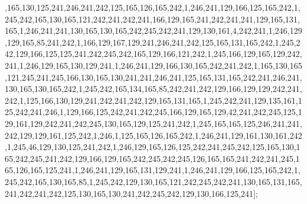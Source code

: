 ,165,130,125,241,246,241,242,125,165,126,165,242,1,246,241,129,166,125,165,242,1,245,242,165,130,165,121,242,241,242,241,166,129,165,241,242,241,241,129,165,131,165,1,246,241,241,130,165,130,165,242,245,242,241,129,130,161,4,242,241,1,246,129,129,165,85,241,242,1,166,129,167,129,241,246,241,242,125,165,131,165,242,1,245,242,129,166,125,125,241,242,245,242,165,129,166,121,242,1,245,166,129,165,129,242,241,1,246,129,165,130,129,241,1,246,241,129,166,130,165,242,241,242,1,165,130,165,121,245,241,245,166,130,165,130,241,241,246,241,125,165,131,165,242,241,246,241,130,165,130,165,242,1,245,242,165,134,165,85,242,241,242,129,166,129,129,242,241,242,1,125,166,130,129,241,242,241,242,129,165,131,165,1,245,242,241,129,135,161,125,242,241,246,1,129,166,125,242,241,242,245,166,129,165,129,42,241,242,245,125,129,161,129,242,241,242,245,130,165,129,125,241,242,1,245,165,165,125,246,241,241,242,129,129,161,125,242,1,246,1,125,165,126,165,242,1,246,241,129,161,130,161,242,1,245,46,129,130,125,241,242,1,246,129,165,126,125,242,241,245,242,125,165,130,165,242,245,241,242,129,166,129,165,242,245,242,245,126,165,165,241,242,241,245,165,126,165,125,241,1,246,241,129,165,131,129,241,1,246,241,129,166,125,165,242,1,245,242,165,130,165,85,1,245,242,129,130,165,121,242,245,242,241,130,165,131,165,241,242,241,242,125,130,165,130,241,242,245,242,129,130,166,125,241];


